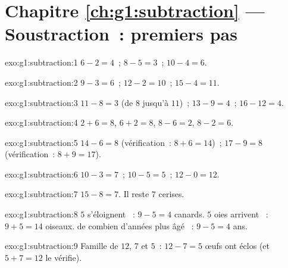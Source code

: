 \section*{Chapitre \ref{ch:g1:subtraction} --- Soustraction~: premiers pas}

\begin{solution}{exo:g1:subtraction:1}
$6 - 2 = 4$~; \quad $8 - 5 = 3$~; \quad $10 - 4 = 6$.
\end{solution}

\begin{solution}{exo:g1:subtraction:2}
$9 - 3 = 6$~; \quad $12 - 2 = 10$~; \quad $15 - 4 = 11$.
\end{solution}

\begin{solution}{exo:g1:subtraction:3}
$11 - 8 = 3$ (de $8$ jusqu'à $11$)~; \quad
$13 - 9 = 4$~; \quad $16 - 12 = 4$.
\end{solution}

\begin{solution}{exo:g1:subtraction:4}
$2 + 6 = 8$, \quad $6 + 2 = 8$, \quad $8 - 6 = 2$, \quad
$8 - 2 = 6$.
\end{solution}

\begin{solution}{exo:g1:subtraction:5}
$14 - 6 = 8$ (vérification~: $8 + 6 = 14$)~; \quad
$17 - 9 = 8$ (vérification~: $8 + 9 = 17$).
\end{solution}

\begin{solution}{exo:g1:subtraction:6}
$10 - 3 = 7$~; \quad $10 - 5 = 5$~; \quad $12 - 0 = 12$.
\end{solution}

\begin{solution}{exo:g1:subtraction:7}
$15 - 8 = 7$. Il reste $7$ cerises.
\end{solution}

\begin{solution}{exo:g1:subtraction:8}
\guillemotleft{} $5$ s'éloignent \guillemotright{}~: $9 - 5 = 4$
canards. \guillemotleft{} $5$ oies arrivent \guillemotright{}~:
$9 + 5 = 14$ oiseaux. \guillemotleft{} de combien d'années plus
âgé \guillemotright{}~: $9 - 5 = 4$ ans.
\end{solution}

\begin{solution}{exo:g1:subtraction:9}
Famille de $12$, $7$ et $5$~: $12 - 7 = 5$ œufs ont éclos (et
$5 + 7 = 12$ le vérifie).
\end{solution}
